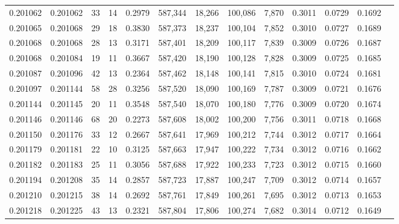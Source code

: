\begin{tabular}{rrrrrrrrrrrrr}
0.201062 & 0.201062 &    33 &  14 &                                     0.2979 & 587,344 &  18,266 & 100,086 &   7,870 & 0.3011 & 0.0729 & 0.1692 \\
0.201065 & 0.201068 &    29 &  18 &                                     0.3830 & 587,373 &  18,237 & 100,104 &   7,852 & 0.3010 & 0.0727 & 0.1689 \\
0.201068 & 0.201068 &    28 &  13 &                                     0.3171 & 587,401 &  18,209 & 100,117 &   7,839 & 0.3009 & 0.0726 & 0.1687 \\
0.201068 & 0.201084 &    19 &  11 &                                     0.3667 & 587,420 &  18,190 & 100,128 &   7,828 & 0.3009 & 0.0725 & 0.1685 \\
0.201087 & 0.201096 &    42 &  13 &                                     0.2364 & 587,462 &  18,148 & 100,141 &   7,815 & 0.3010 & 0.0724 & 0.1681 \\
0.201097 & 0.201144 &    58 &  28 &                                     0.3256 & 587,520 &  18,090 & 100,169 &   7,787 & 0.3009 & 0.0721 & 0.1676 \\
0.201144 & 0.201145 &    20 &  11 &                                     0.3548 & 587,540 &  18,070 & 100,180 &   7,776 & 0.3009 & 0.0720 & 0.1674 \\
0.201146 & 0.201146 &    68 &  20 &                                     0.2273 & 587,608 &  18,002 & 100,200 &   7,756 & 0.3011 & 0.0718 & 0.1668 \\
0.201150 & 0.201176 &    33 &  12 &                                     0.2667 & 587,641 &  17,969 & 100,212 &   7,744 & 0.3012 & 0.0717 & 0.1664 \\
0.201179 & 0.201181 &    22 &  10 &                                     0.3125 & 587,663 &  17,947 & 100,222 &   7,734 & 0.3012 & 0.0716 & 0.1662 \\
0.201182 & 0.201183 &    25 &  11 &                                     0.3056 & 587,688 &  17,922 & 100,233 &   7,723 & 0.3012 & 0.0715 & 0.1660 \\
0.201194 & 0.201208 &    35 &  14 &                                     0.2857 & 587,723 &  17,887 & 100,247 &   7,709 & 0.3012 & 0.0714 & 0.1657 \\
0.201210 & 0.201215 &    38 &  14 &                                     0.2692 & 587,761 &  17,849 & 100,261 &   7,695 & 0.3012 & 0.0713 & 0.1653 \\
0.201218 & 0.201225 &    43 &  13 &                                     0.2321 & 587,804 &  17,806 & 100,274 &   7,682 & 0.3014 & 0.0712 & 0.1649 \\

\end{tabular}
